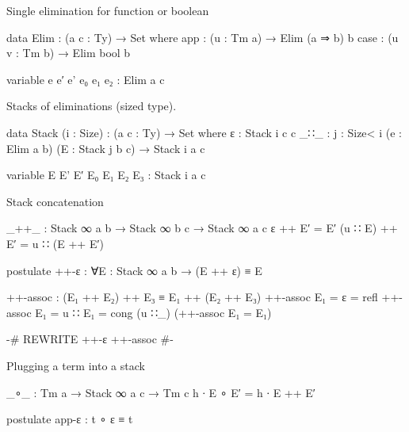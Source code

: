   Single elimination for function or boolean

\begin{code}
  data Elim : (a c : Ty) → Set where
    app   : (u : Tm a)    → Elim (a ⇒ b)  b
    case  : (u v : Tm b)  → Elim bool     b

  variable e e′ e' e₀ e₁ e₂ : Elim a c
\end{code}

  Stacks of eliminations (sized type).

\begin{code}
  data Stack (i : Size) : (a c : Ty) → Set where
    ε    : Stack i c c
    _∷_  : {j : Size< i} (e : Elim a b) (E : Stack j b c) → Stack i a c
\end{code}


\begin{code}
  variable E E' E′ E₀ E₁ E₂ E₃ : Stack i a c
\end{code}

Stack concatenation

\begin{code}
_++_ : Stack ∞ a b → Stack ∞ b c → Stack ∞ a c
ε        ++ E′ = E′
(u ∷ E)  ++ E′ = u ∷ (E ++ E′)

postulate
  ++-ε : ∀{E : Stack ∞ a b} → (E ++ ε) ≡ E
\end{code}


\begin{code}
++-assoc : (E₁ ++ E₂) ++ E₃ ≡ E₁ ++ (E₂ ++ E₃)
++-assoc {E₁ = ε}       = refl
++-assoc {E₁ = u ∷ E₁}  = cong (u ∷_) (++-assoc {E₁ = E₁})

{-# REWRITE ++-ε ++-assoc #-}
\end{code}

Plugging a term into a stack

\begin{code}
_∘_ : Tm a → Stack ∞ a c → Tm c
h ∙ E ∘ E′ = h ∙ E ++ E′

postulate
  app-ε : t ∘ ε ≡ t
\end{code}


